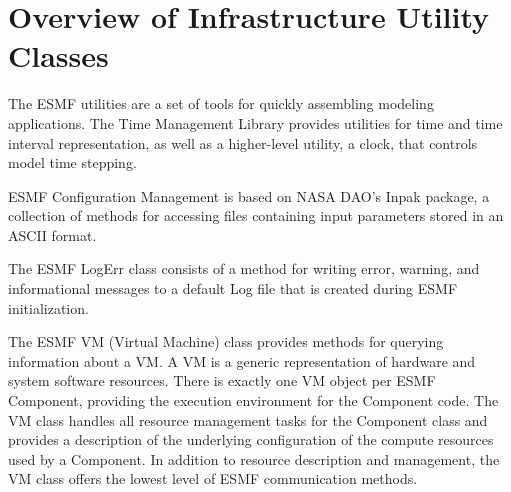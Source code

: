 
\section{Overview of Infrastructure Utility Classes}

The ESMF utilities are a set of tools for quickly assembling modeling applications.  The Time Management Library provides utilities for time and time interval representation, as well as a higher-level utility, a clock, that controls model time stepping.

ESMF Configuration Management is based on NASA DAO's Inpak package, a collection of methods for accessing files containing input parameters stored in an ASCII format.

The ESMF LogErr class consists of a method for writing error, warning, and informational messages to a default Log file that is created during ESMF initialization.

The ESMF VM (Virtual Machine) class provides methods for querying information about a VM. A VM is a generic representation of hardware and system software resources. There is exactly one VM object per ESMF Component, providing the execution environment for the Component code. The VM class handles all resource management tasks for the Component class and provides a description of the underlying configuration of the compute resources used by a Component.  In addition to resource description and management, the VM class offers the lowest level of ESMF communication methods.
